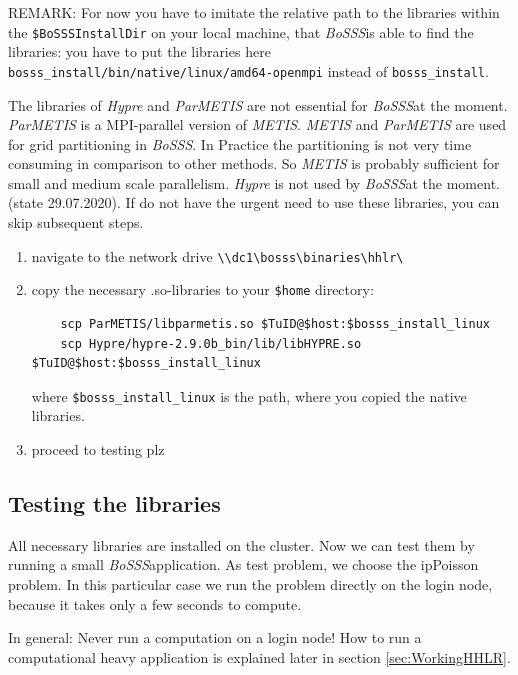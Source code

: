 \documentclass[11pt,twoside,a4paper]{fdyartcl}
\newcommand{\Bosss}{\textit{BoSSS}}
\begin{document}
REMARK: For now you have to imitate the relative path to the libraries within the \verb|$BoSSSInstallDir| on your local machine, that \Bosss is able to find the libraries: you have to put the libraries here \verb|bosss_install/bin/native/linux/amd64-openmpi| instead of \verb|bosss_install|.

The libraries of \emph{Hypre} and \emph{ParMETIS} are not essential for \Bosss at the moment.
\emph{ParMETIS} is a MPI-parallel version of \emph{METIS}. \emph{METIS} and \emph{ParMETIS} are used for grid partitioning in \Bosss. In Practice the partitioning is not very time consuming in comparison to other methods. So \emph{METIS} is probably sufficient for small and medium scale parallelism.
\emph{Hypre} is not used by \Bosss at the moment. (state 29.07.2020).
If do not have the urgent need to use these libraries, you can skip subsequent steps.

\begin{enumerate}
	\item navigate to the network drive \verb|\\dc1\bosss\binaries\hhlr\|
	\item copy the necessary .so-libraries to your \verb|$home| directory:
	\begin{verbatim}
	scp ParMETIS/libparmetis.so $TuID@$host:$bosss_install_linux
	scp Hypre/hypre-2.9.0b_bin/lib/libHYPRE.so $TuID@$host:$bosss_install_linux
	\end{verbatim}
	where \verb|$bosss_install_linux| is the path, where you copied the native libraries.
	\item proceed to testing plz
\end{enumerate}


\subsection{Testing the libraries}
\label{sec:testing}
All necessary libraries are installed on the cluster. Now we can test them by running a small \Bosss application. As test problem, we choose the ipPoisson problem. In this particular case we run the problem directly on the login node, because it takes only a few seconds to compute. 

In general: Never run a computation on a login node! How to run a computational heavy application is explained later in section \ref{sec:WorkingHHLR}.

\end{document}
